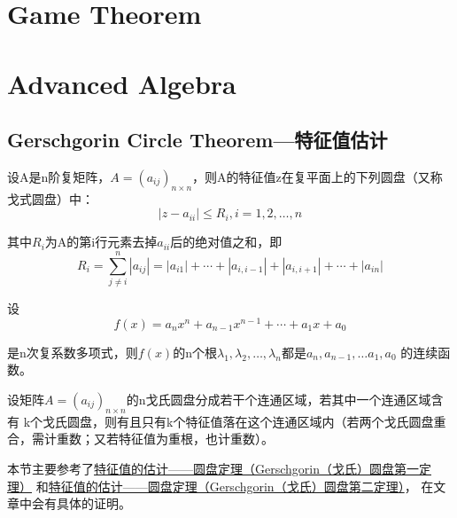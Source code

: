 \documentclass[lang=cn,10pt]{elegantbook}
\begin{document}
\chapter{Game Theorem}



\chapter{Advanced Algebra}
\section{Gerschgorin Circle Theorem—特征值估计\label{Gerschgorin}}
\begin{theorem}[圆盘第一定理]\label{Gerschgorin1}
	设A是n阶复矩阵，$A=(a_{ij})_{n \times n}$，则A的特征值z在复平面上的下列圆盘（又称戈式圆盘）中：
	\begin{equation*}
		|z-a_{ii}|\leq R_i,i=1,2,\ldots,n
	\end{equation*}
	\par 其中$R_i$为A的第i行元素去掉$a_{ii}$后的绝对值之和，即
	\begin{equation*}
		R_i=\sum_{j\neq i}^n|a_{ij}|=|a_{i1}|+\cdots+|a_{i,i-1}|+|a_{i,i+1}|+\cdots+|a_{in}|
	\end{equation*}
\end{theorem}

\begin{lemma}
	设\begin{equation*}
		f(x)=a_nx^n+a_{n-1}x^{n-1}+\cdots+a_1x+a_0
	\end{equation*}
	\par 是n次复系数多项式，则$f(x)$的n个根$\lambda_{1},\lambda_{2},\ldots,\lambda_{n}$都是$a_n,a_{n-1},\ldots a_1,a_0$
	的连续函数。
\end{lemma}

\begin{theorem}[圆盘第二定理]
	设矩阵$A=(a_{ij})_{n \times n}$的n戈氏圆盘分成若干个连通区域，若其中一个连通区域含有
	k个戈氏圆盘，则有且只有k个特征值落在这个连通区域内（若两个戈氏圆盘重合，需计重数；又若特征值为重根，也计重数）。
\end{theorem}

本节主要参考了\href{https://zhuanlan.zhihu.com/p/418915975}{特征值的估计——圆盘定理（Gerschgorin（戈氏）圆盘第一定理）}
和\href{https://zhuanlan.zhihu.com/p/419195345}{特征值的估计——圆盘定理（Gerschgorin（戈氏）圆盘第二定理）}，
在文章中会有具体的证明。
\end{document}
